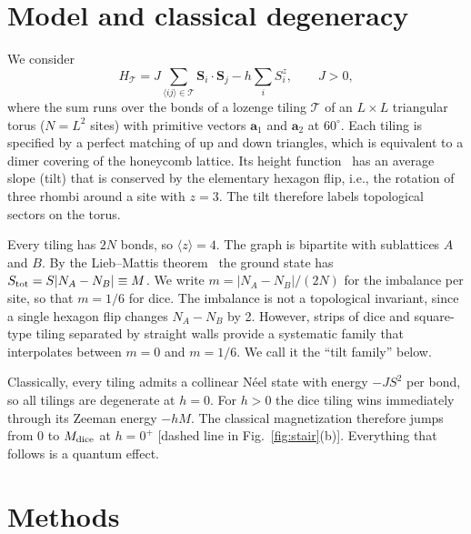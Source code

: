 \documentclass[prb,twocolumn,amsmath,amssymb,floatfix]{revtex4-2}
\newcommand{\Md}{M_{\rm dice}}
\begin{document}
\section{Model and classical degeneracy}\label{sec:model}


We consider
\begin{equation}
H_{\mathcal T}=J\sum_{\langle ij\rangle\in\mathcal T}\mathbf S_i\cdot\mathbf S_j-h\sum_iS_i^z,\qquad J>0,
\label{eq:H}
\end{equation}
where the sum runs over the bonds of a lozenge tiling $\mathcal T$ of an $L\times L$ triangular torus ($N=L^2$ sites) with primitive vectors $\mathbf a_1$ and $\mathbf a_2$ at $60^\circ$. Each tiling is specified by a perfect matching of up and down triangles, which is equivalent to a dimer covering of the honeycomb lattice. Its height function~\cite{BloteHilhorst1982,Kenyon2006} has an average slope (tilt) that is conserved by the elementary hexagon flip, i.e., the rotation of three rhombi around a site with $z=3$. The tilt therefore labels topological sectors on the torus.

Every tiling has $2N$ bonds, so $\langle z\rangle=4$. The graph is bipartite with sublattices $A$ and $B$. By the Lieb--Mattis theorem~\cite{LiebMattis1962,Lieb1989} the ground state has $S_{\rm tot}=S|N_A-N_B|\equiv M$. We write $m=|N_A-N_B|/(2N)$ for the imbalance per site, so that $m=1/6$ for dice. The imbalance is not a topological invariant, since a single hexagon flip changes $N_A-N_B$ by 2. However, strips of dice and square-type tiling separated by straight walls provide a systematic family that interpolates between $m=0$ and $m=1/6$. We call it the ``tilt family'' below.

Classically, every tiling admits a collinear N\'eel state with energy $-JS^2$ per bond, so all tilings are degenerate at $h=0$. For $h>0$ the dice tiling wins immediately through its Zeeman energy $-hM$. The classical magnetization therefore jumps from 0 to $\Md$ at $h=0^+$ [dashed line in Fig.~\ref{fig:stair}(b)]. Everything that follows is a quantum effect.

\section{Methods}\label{sec:methods}
\end{document}

